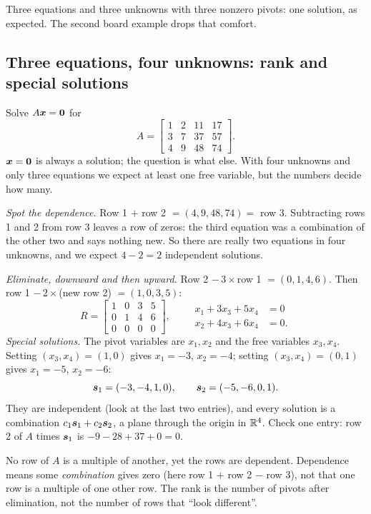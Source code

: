 Three equations and three unknowns with three nonzero pivots: one solution, as expected. The second board example drops that comfort.

\subsection{Three equations, four unknowns: rank and special solutions}

\begin{example}\label{ex:u41-rank}
Solve $A\boldsymbol{x}=\boldsymbol{0}$ for
\[
A=\begin{bmatrix}1&2&11&17\\3&7&37&57\\4&9&48&74\end{bmatrix}.
\]
$\boldsymbol{x}=\boldsymbol{0}$ is always a solution; the question is what else. With four unknowns and only three equations we expect at least one free variable, but the numbers decide how many.

\emph{Spot the dependence.} Row 1 $+$ row 2 $=(4,9,48,74)=$ row 3. Subtracting rows 1 and 2 from row 3 leaves a row of zeros: the third equation was a combination of the other two and says nothing new. So there are really two equations in four unknowns, and we expect $4-2=2$ independent solutions.

\emph{Eliminate, downward and then upward.} Row 2 $-\,3\times$row 1 $=(0,1,4,6)$. Then row 1 $-\,2\times$(new row 2) $=(1,0,3,5)$:
\[
R=\begin{bmatrix}1&0&3&5\\0&1&4&6\\0&0&0&0\end{bmatrix},\qquad
\begin{aligned}x_1+3x_3+5x_4&=0\\ x_2+4x_3+6x_4&=0.\end{aligned}
\]
\emph{Special solutions.} The pivot variables are $x_1,x_2$ and the free variables $x_3,x_4$. Setting $(x_3,x_4)=(1,0)$ gives $x_1=-3$, $x_2=-4$; setting $(x_3,x_4)=(0,1)$ gives $x_1=-5$, $x_2=-6$:
\[
\boldsymbol{s}_1=(-3,-4,1,0),\qquad \boldsymbol{s}_2=(-5,-6,0,1).
\]
They are independent (look at the last two entries), and every solution is a combination $c_1\boldsymbol{s}_1+c_2\boldsymbol{s}_2$, a plane through the origin in $\mathbb{R}^{4}$. Check one entry: row 2 of $A$ times $\boldsymbol{s}_1$ is $-9-28+37+0=0$.
\end{example}

\begin{trap}
No row of $A$ is a multiple of another, yet the rows are dependent. Dependence means some \emph{combination} gives zero (here row 1 $+$ row 2 $-$ row 3), not that one row is a multiple of one other row. The rank is the number of pivots after elimination, not the number of rows that ``look different''.
\end{trap}

